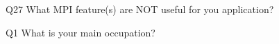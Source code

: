 \begin{description}%
\item{Q27} What MPI feature(s) are NOT useful for you application?%
\item{Q1} What is your main occupation?%
\end{description}%
